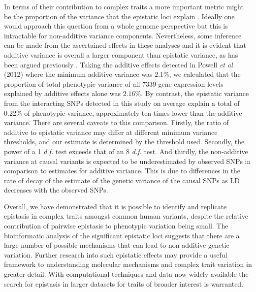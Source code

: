 \documentclass{article}
\begin{document}
In terms of their contribution to complex traits a more important metric might be the proportion of the variance that the epistatic loci explain \cite{Hill2008a}. Ideally one would approach this question from a whole genome perspective \cite{Visscher2008} but this is intractable for non-additive variance components. Nevertheless, some inference can be made from the ascertained effects in these analyses and it is evident that additive variance is overall a larger component than epistatic variance, as has been argued previously \cite{Hill2008a, Crow2010}. Taking the additive effects detected in Powell \emph{et al} (2012) where the minimum additive variance was $2.1\%$, we calculated that the proportion of total phenotypic variance of all 7339 gene expression levels explained by additive effects alone was $2.16\%$. By contrast, the epistatic variance from the interacting SNPs detected in this study on average explain a total of 0.22\% of phenotypic variance, approximately ten times lower than the additive variance. There are several caveats to this comparison. Firstly, the ratio of additive to epistatic variance may differ at different minimum variance thresholds, and our estimate is determined by the threshold used. Secondly, the power of a 1 \emph{d.f.} test exceeds that of an 8 \emph{d.f.} test. And thirdly, the non-additive variance at causal variants is expected to be underestimated by observed SNPs in comparison to estimates for additive variance. This is due to differences in the rate of decay of the estimate of the genetic variance of the causal SNPs as LD decreases with the observed SNPs.


Overall, we have demonstrated that it is possible to identify and replicate epistasis in complex traits amongst common human variants, despite the relative contribution of pairwise epistasis to phenotypic variation being small. The bioinformatic analysis of the significant epistatic loci suggests that there are a large number of possible mechanisms that can lead to non-additive genetic variation. Further research into such epistatic effects may provide a useful framework to understanding molecular mechanisms and complex trait variation in greater detail. With computational techniques and data now widely available the search for epistasis in larger datasets for traits of broader interest is warranted.
\end{document}
